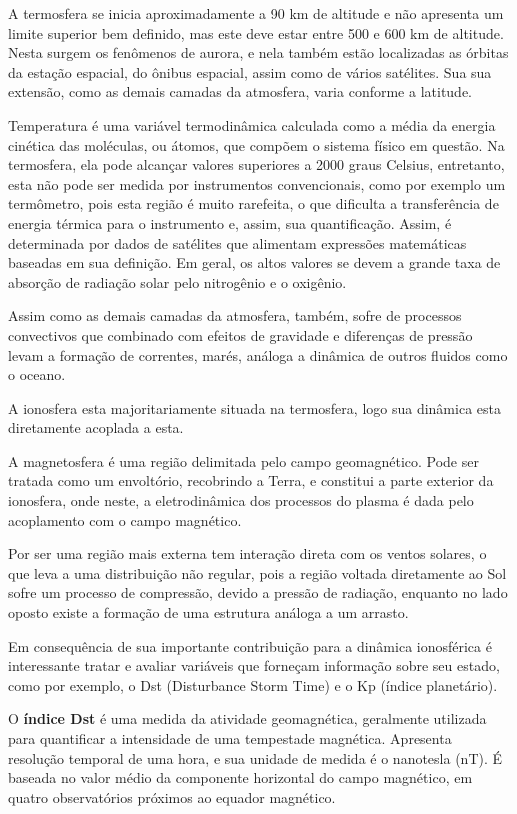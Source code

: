 A termosfera se inicia aproximadamente a 90 km de altitude e não apresenta um limite superior bem definido, mas este deve estar entre 500 e 600 km de altitude. Nesta surgem os fenômenos de aurora, e nela também estão localizadas as órbitas da estação espacial, do ônibus espacial, assim como de vários satélites. Sua sua extensão, como as demais camadas da atmosfera, varia conforme a latitude. 

Temperatura é uma variável termodinâmica calculada como a média da energia cinética das moléculas, ou átomos, que compõem o sistema físico em questão. Na termosfera, ela pode alcançar valores superiores a 2000 graus Celsius, entretanto, esta não pode ser medida por instrumentos convencionais, como por exemplo um termômetro, pois esta região é muito rarefeita, o que dificulta a transferência de energia térmica para o instrumento e, assim, sua quantificação. Assim, é determinada por dados de satélites que alimentam expressões matemáticas baseadas em sua definição. Em geral, os altos valores se devem a grande taxa de absorção de radiação solar pelo nitrogênio e o oxigênio.

Assim como as demais camadas da atmosfera, também, sofre de processos convectivos que combinado com efeitos de gravidade e diferenças de pressão levam a formação de correntes, marés, análoga a dinâmica de outros fluidos como o oceano.

A ionosfera esta majoritariamente situada na termosfera, logo sua dinâmica esta diretamente acoplada a esta.

A magnetosfera é uma região delimitada pelo campo geomagnético. Pode ser tratada como um envoltório, recobrindo a Terra, e constitui a parte exterior da ionosfera, onde neste, a eletrodinâmica dos processos do plasma é dada pelo acoplamento com o campo magnético.

Por ser uma região mais externa tem interação direta com os ventos solares, o que leva  a uma distribuição não regular, pois a região voltada diretamente ao Sol sofre um processo de compressão, devido a pressão de radiação, enquanto no lado oposto existe a formação de uma estrutura análoga a um arrasto.

Em consequência de sua importante contribuição para a dinâmica ionosférica é interessante tratar e avaliar variáveis que forneçam informação sobre seu estado, como por exemplo, o Dst (Disturbance Storm Time) e o Kp (índice planetário).

O {\bf índice Dst} é uma medida da atividade geomagnética, geralmente utilizada para quantificar a intensidade de uma tempestade magnética. Apresenta resolução temporal de uma hora, e sua unidade de medida é o nanotesla (nT). É baseada no valor médio da componente horizontal do campo magnético, em quatro observatórios próximos ao equador magnético.

